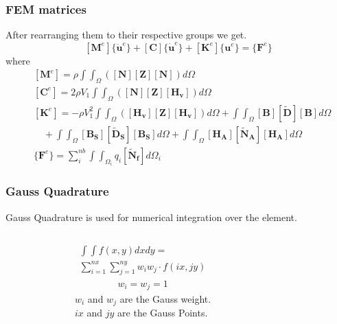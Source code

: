 \documentclass[9pt]{beamer}
\begin{document}
\begin{frame}
\frametitle{FEM matrices}
After rearranging them to their respective groups we get.
\begin{equation*}
\left[ \mathbf{M}^e  \right] 
\{ \ddot{\mathbf{u}}^e \}
+
\left[ \mathbf{C}  \right] 
\{ \dot{\mathbf{u}}^e \}
+
\left[ \mathbf{K}^e  \right] 
\{\mathbf{u}^e \}
=
\{ \mathbf{F}^e \}
\end{equation*}
where 
\begin{align*}
&\left[ \mathbf{M}^e  \right]  
= \rho
\int \int_\Omega 
\left(
\left[ \mathbf{N}  \right]
\left[ \mathbf{Z}  \right]
\left[ \mathbf{N}  \right] 
\right)  d \Omega  \\
&\left[ \mathbf{C}^e  \right]   
= 2 \rho V_1
\int \int_\Omega 
\left( 
\left[ \mathbf{N}  \right]
\left[ \mathbf{Z}  \right]
\left[ \mathbf{H_v}  \right] 
\right)  d \Omega  \\ &
\left[ \mathbf{K} ^e \right] 
=  - \rho V_1^2
\int \int_\Omega 
\left( 
\left[ \mathbf{H_v}  \right]
\left[ \mathbf{Z}  \right]
\left[ \mathbf{H_v}  \right] 
\right)  d \Omega + 
\int \int_\Omega  
\left[ \mathbf{B}  \right]
\left[ \mathbf{\tilde{D}}  \right]
\left[ \mathbf{B}  \right]  
  d \Omega   \\  &  \quad +
  \int \int_\Omega  
\left[ \mathbf{B_S}  \right]
\left[ \mathbf{\tilde{D}_S}  \right]
\left[ \mathbf{B_S}  \right] 
  d \Omega +
  \int \int_\Omega  
\left[ \mathbf{H_A}  \right]
\left[ \mathbf{\tilde{N}_A}  \right]
\left[ \mathbf{H_A}  \right]  
  d \Omega  \\ &
\{ \mathbf{F}^e \}  = 
 \sum_i^{nb}   \int  \int_{\Omega_i}   
 q_i 
\left[ \mathbf{\tilde{N}_f}  \right] 
  d \Omega_i    
\end{align*}
\end{frame}


\begin{frame}
\frametitle{Gauss Quadrature}
Gauss Quadrature is used for numerical integration over the element.
\begin{columns}
\begin{figure}[h!]
\centering

\end{figure}
\begin{equation*}
\begin{split}
\int \int f(x,y) dx dy = \\
 \sum_{i = 1}^{nx} \sum_{j = 1}^{ny} w_i  w_j \cdot f(ix,jy) 
\end{split}
\end{equation*}
\begin{equation*}
\begin{split}
w_i = w_j =1
\end{split}
\end{equation*}
$w_i$ and $w_j$ are the Gauss weight.\\
 $ix$ and $jy$ are the Gauss Points. 

\end{columns}

\end{frame}
\end{document}
